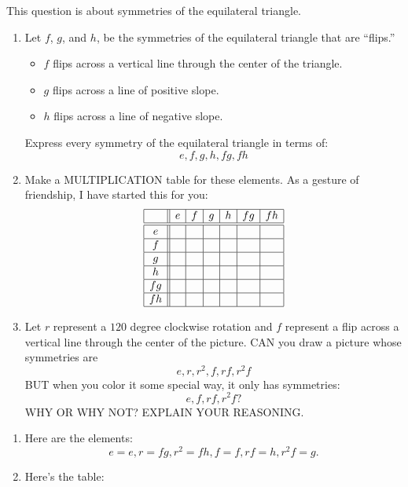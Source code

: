 \documentclass[noauthor,nooutcomes,12pt,hints]{ximera}
\begin{document}
\begin{question}
  This question is about symmetries of the equilateral triangle.
  \begin{enumerate}
  \item Let $f$, $g$, and $h$, be the symmetries of the equilateral
    triangle that are ``flips.''
    \begin{itemize}
    \item $f$ flips across a vertical line through the center of the triangle.
    \item $g$ flips across a line of positive slope.
    \item $h$ flips across a line of negative slope.
    \end{itemize}
    Express every symmetry of the equilateral triangle in terms of:
    \[
    e,f,g,h,fg,fh
    \]
  \item Make a MULTIPLICATION table for these elements. As a gesture
    of friendship, I have started this for you:
           \[
  \begin{array}{|c||c|c|c|c|c|c|}
    \hline
    & e & f & g & h & fg & fh\\ \hline\hline
    e &  &   &     &   &    &     \\ \hline
    f &   &     &   &    &      &  \\ \hline
    g &     &   &   &      &   &  \\ \hline
    h  &   &      &    &   &     &  \\ \hline
    fg &    &   &      &   &   &    \\ \hline
    fh &      &    &   &     &   &  \\ \hline
  \end{array}
  \]
  \item Let $r$ represent a $120$ degree clockwise rotation and $f$
    represent a flip across a vertical line through the center of the
    picture. CAN you draw a picture whose symmetries are
    \[
    e,r,r^2,f,rf,r^2f
    \]
    BUT when you color it some special way, it only has symmetries:
    \[
    e,f,rf,r^2f?
    \]
    WHY OR WHY NOT? EXPLAIN YOUR REASONING.
  \end{enumerate}
  \begin{freeResponse}
    \begin{enumerate}
    \item Here are the elements:
      \[
      e = e, r = fg, r^2 = fh, f= f, rf = h, r^2f=g.
      \]
    \item  Here's the table:
      \[
      \begin{array}{|c||c|c|c|c|c|c|}

\end{array}\]
\end{enumerate}
\end{freeResponse}
\end{question}
\end{document}
